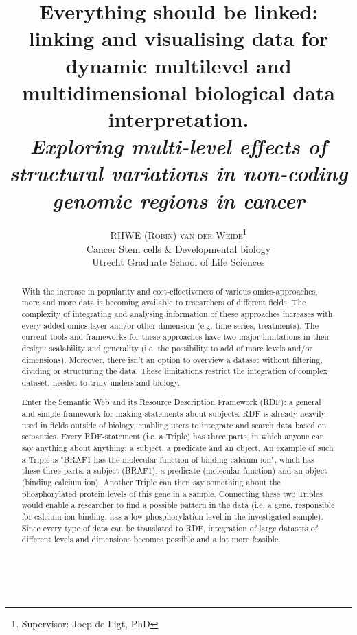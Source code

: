 \documentclass[twoside,fontsize=10pt]{article}
\title{\vspace{-15mm}\fontsize{18pt}{10pt}\normalfont\textbf{Everything should be linked: linking and visualising data for dynamic multilevel and multidimensional biological data interpretation.\\ \vspace{4 mm} {{\footnotesize \textit{Exploring multi-level effects of structural variations in non-coding genomic regions in cancer}}}}} %
\author{
\large
\textsc{RHWE (Robin) van der Weide}\thanks{Supervisor: Joep de Ligt, PhD}\\[2mm] %
\normalsize   Cancer Stem cells \& Developmental biology \\ %
\normalsize  Utrecht Graduate School of Life Sciences \\ %
\vspace{-5mm}
}
\date{}
\renewcommand{\abstractname}{}    %
\begin{document}
\maketitle %

\thispagestyle{fancy} %

\newpage
\mbox{   }
\newpage
\renewcommand{\abstractname}{\begin{center}
Summary of the research
\end{center}}    %
\begin{abstract}
\noindent With the increase in popularity and cost-effectiveness of various omics-approaches, more and more data is becoming available to researchers of different fields. The complexity of integrating and analysing information of these approaches increases with every added omics-layer and/or other dimension (e.g. time-series, treatments). The current tools and frameworks for these approaches have two major limitations in their design: scalability and generality (i.e. the possibility to add of more levels and/or dimensions). Moreover, there isn't an option to overview a dataset without filtering, dividing or structuring the data. These limitations restrict the integration of complex dataset, needed to truly understand biology.
\medskip

\noindent Enter the Semantic Web and its Resource Description Framework (RDF): a general and simple framework for making statements about subjects.  RDF is already heavily used in fields outside of biology, enabling users to integrate and search data based on semantics. Every RDF-statement (i.e. a Triple) has three parts, in which anyone can say anything about anything: a subject, a predicate and an object. An example of such a Triple is "BRAF1 has the molecular function of binding calcium ion", which has these three parts: a subject (BRAF1), a predicate (molecular function) and an object (binding calcium ion). Another Triple can then say something about the phosphorylated protein levels of this gene in a sample. Connecting these two Triples would enable a researcher to find a possible pattern in the data (i.e. a gene, responsible for calcium ion binding, has a low phosphorylation level in the investigated sample). Since every type of data can be translated to RDF, integration of large datasets of different levels and dimensions becomes possible and a lot more feasible. 
\medskip


\end{abstract}
\end{document}
